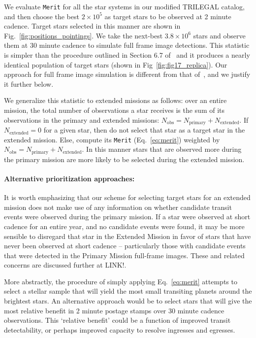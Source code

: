 We evaluate \texttt{Merit} for all the star systems in our modified
TRILEGAL catalog, and then choose the best $2\times10^5$ as target
stars to be observed at 2 minute cadence.  Target stars selected in
this manner are shown in Fig.~\ref{fig:positions_pointings}.  We take
the next-best $3.8\times10^6$ stars and observe them at 30 minute
cadence to simulate full frame image detections.  This statistic is
simpler than the procedure outlined in Section 6.7
of~ and it produces a nearly identical
population of target stars (shown in Fig~\ref{fig:fig17_replica}).
Our approach for full frame image simulation is different from that
of~, and we justify it further below.

We generalize this statistic to extended missions as follows: over an
entire mission, the total number of observations a star receives is
the sum of its observations in the primary and extended missions:
$N_\text{obs}=N_\text{primary}+N_\text{extended}$.  If
$N_\text{extended}=0$ for a given star, then do not select that star as a
target star in the extended mission.  Else, compute its \texttt{Merit}
(Eq.~\ref{eq:merit}) weighted by
$N_\text{obs}=N_\text{primary}+N_\text{extended}$.  In this manner
stars that are observed more during the primary mission are more
likely to be selected during the extended mission.
 

\paragraph{Alternative prioritization approaches:}

It is worth emphasizing that our scheme for selecting target stars for
an extended mission does not make use of any information on whether
candidate transit events were observed during the primary mission.  If
a star were observed at short cadence for an entire year, and no
candidate events were found, it may be more sensible to disregard that
star in the Extended Mission in favor of stars that have never been
observed at short cadence -- particularly those with candidate events
that were detected in the Primary Mission full-frame images.  These
and related concerns are discussed further at LINK!.

More abstractly, the procedure of simply applying Eq.~\ref{eq:merit}
attempts to select a stellar sample that will yield the most small
transiting planets around the brightest stars.  An alternative
approach would be to select stars that will give the most relative
benefit in 2 minute postage stamps over 30 minute cadence
observations.  This `relative benefit' could be a function of improved
transit detectability, or perhaps improved capacity to resolve
ingresses and egresses.

